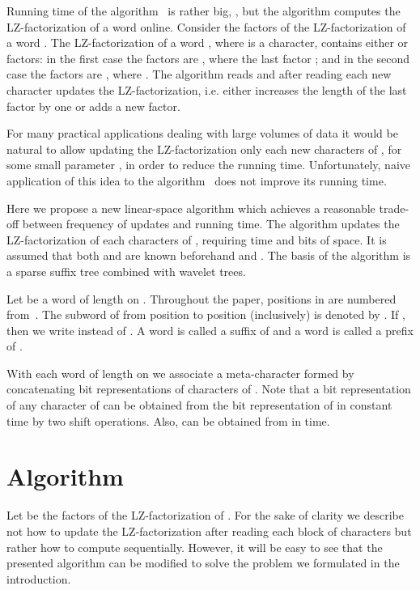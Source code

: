 \documentclass[10pt]{llncs}
\begin{document}
Running time of the algorithm~\cite{Okanohara:2008:OAF:1431008.1431068} is rather big, , but the algorithm computes the LZ-factorization of a word  online. Consider the factors  of the LZ-factorization of a word . The LZ-factorization of a word , where  is a character, contains either  or  factors: in the first case the factors are , where the last factor ; and in the second case the factors are , where . The algorithm reads  and after reading each new character updates the LZ-factorization, i.e. either increases the length of the last factor by one or adds a new factor.

For many practical applications dealing with large volumes of data it would be natural to allow updating the LZ-factorization only each  new characters of , for some small parameter , in order to reduce the running time. Unfortunately, naive application of this idea to the algorithm~\cite{Okanohara:2008:OAF:1431008.1431068} does not improve its running time.

Here we propose a new linear-space algorithm which achieves a reasonable trade-off between frequency of updates and running time. The algorithm updates the LZ-factorization of  each  characters of , requiring  time and  bits of space. It is assumed that both  and  are known beforehand and . The basis of the algorithm is a sparse suffix tree combined with wavelet trees.

Let  be a word of length  on . Throughout the paper, positions in  are numbered from~. The subword of  from position  to position  (inclusively) is denoted by . If , then we write  instead of . A word  is called a suffix of  and a word  is called a prefix of .

With each word  of length  on  we associate a meta-character  formed by concatenating bit representations of characters of . Note that a bit representation of any character of  can be obtained from the bit representation of  in constant time by two shift operations. Also,  can be obtained from  in  time.

\section{Algorithm}
Let  be the factors of the LZ-factorization of . For the sake of clarity we describe not how to update the LZ-factorization after reading each block of characters but rather how to compute  sequentially. However, it will be easy to see that the presented algorithm can be modified to solve the problem we formulated in the introduction.
\end{document}
